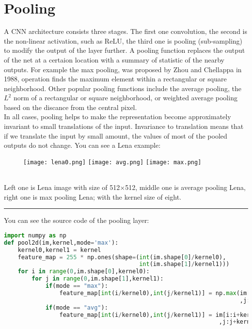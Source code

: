 \documentclass[11pt]{article}
\begin{document}
\section{Pooling}
\hspace*{1cm} A CNN architecture consists three stages. The first one convolution, the second is the non-linear activation, such as ReLU, the third one is pooling (sub-sampling) to modify the output of the layer further. A pooling function replaces the output of the net at a certaion location with a summary of statistic of the nearby outputs. For example the max pooling, was proposed by Zhou and Chellappa in 1988, operation finds the maximum element within a rectangular or square neighborhood. Other popular pooling functions include the average pooling, the $L^2$ norm of a rectangular or square neighborhood, or weighted average pooling based on the discance from the central pixel.\cite{GoodBengCour16}\\
In all cases, pooling helps to make the representation become approximately invariant to small translations of the input. Invariance to translation means that if we translate the input by small amount, the values of most of the pooled outputs do not change. You can see a Lena example:
\begin{figure}[htp]

\centering
\texttt{[image: lena0.png]}\hfill
\texttt{[image: avg.png]}\hfill
\texttt{[image: max.png]}

\caption{}
\label{fig:x}
\end{figure}\\
Left one is Lena image with size of 512$\times$512, middle one is average pooling Lena, right one is max pooling Lena; with the kernel size of eight.
\\
\par\noindent\rule{\textwidth}{0.5pt}
\pagebreak
You can see the source code of the pooling layer:\\
\begin{lstlisting}[language=Python,basicstyle=\tiny]
import numpy as np
def pool2d(im,kernel,mode='max'):
    kernel0,kernel1 = kernel
    feature_map = 255 * np.ones(shape=(int(im.shape[0]/kernel0),
                                       int(im.shape[1]/kernel1)))
    for i in range(0,im.shape[0],kernel0):
        for j in range(0,im.shape[1],kernel1):
            if(mode == "max"):
                feature_map[int(i/kernel0),int(j/kernel1)] = np.max(im[i:i+kernel0
                                                                    ,j:j+kernel1])
            if(mode == "avg"):
                feature_map[int(i/kernel0),int(j/kernel1)] = im[i:i+kernel0
                                                              ,j:j+kernel1].mean()
\end{lstlisting}
\end{document}
